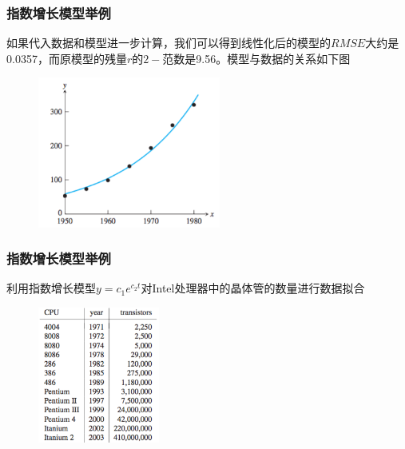 \documentclass[10pt]{beamer}
\begin{document}
\begin{frame}
\frametitle{指数增长模型举例}
如果代入数据和模型进一步计算，我们可以得到线性化后的模型的$RMSE$大约是0.0357，而原模型的残量$r$的$2-$范数是9.56。模型与数据的关系如下图
\begin{figure}
\includegraphics[width=6cm]{figs/4-2-2_Exponential_Growth-2} 
\end{figure}
\end{frame}


\begin{frame}
\frametitle{指数增长模型举例}
\begin{example}
利用指数增长模型$y = c_1 e^{c_2 t}$对Intel处理器中的晶体管的数量进行数据拟合
\begin{figure}
\includegraphics[width=4cm]{figs/4-2-2_Exponential_Growth-3} 
\end{figure}
\end{example}
\end{frame}
\end{document}
